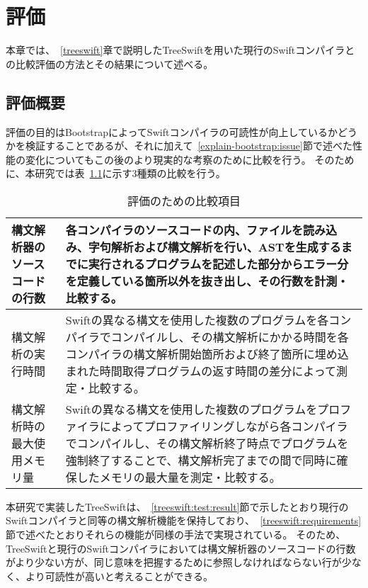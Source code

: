 \chapter{評価}
\label{evaluation}

本章では、~\ref{treeswift}章で説明したTreeSwiftを用いた現行のSwiftコンパイラとの比較評価の方法とその結果について述べる。


\section{評価概要}

評価の目的はBootstrapによってSwiftコンパイラの可読性が向上しているかどうかを検証することであるが、それに加えて~\ref{explain-bootstrap:issue}節で述べた性能の変化についてもこの後のより現実的な考察のために比較を行う。
そのために、本研究では表~\ref{table:evaluation-items}に示す3種類の比較を行う。

\begin{table}[hb]
    \begin{center}
        \caption{評価のための比較項目}
        \begin{tabular}{|m{4cm}|m{11cm}|}
            \hline
            構文解析器のソースコードの行数 & 各コンパイラのソースコードの内、ファイルを読み込み、字句解析および構文解析を行い、ASTを生成するまでに実行されるプログラムを記述した部分からエラー分を定義している箇所以外を抜き出し、その行数を計測・比較する。 \\
            \hline
            構文解析の実行時間 & Swiftの異なる構文を使用した複数のプログラムを各コンパイラでコンパイルし、その構文解析にかかる時間を各コンパイラの構文解析開始箇所および終了箇所に埋め込まれた時間取得プログラムの返す時間の差分によって測定・比較する。 \\
            \hline
            構文解析時の最大使用メモリ量 & Swiftの異なる構文を使用した複数のプログラムをプロファイラによってプロファイリングしながら各コンパイラでコンパイルし、その構文解析終了時点でプログラムを強制終了することで、構文解析完了までの間で同時に確保したメモリの最大量を測定・比較する。 \\
            \hline
        \end{tabular}
        \label{table:evaluation-items}
    \end{center}
\end{table}

本研究で実装したTreeSwiftは、~\ref{treeswift:test:result}節で示したとおり現行のSwiftコンパイラと同等の構文解析機能を保持しており、~\ref{treeswift:requirements}節で述べたとおりそれらの機能が同様の手法で実現されている。
そのため、TreeSwiftと現行のSwiftコンパイラにおいては構文解析器のソースコードの行数がより少ない方が、同じ意味を把握するために参照しなければならない行が少なく、より可読性が高いと考えることができる。


